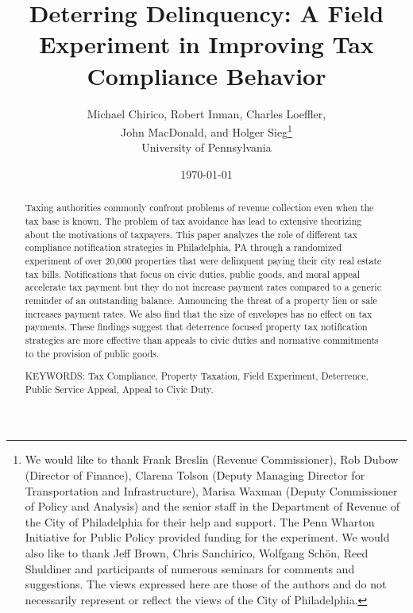 \documentclass[12pt,titlepage]{article}
\renewcommand{\thefootnote}{\fnsymbol{footnote}}
\begin{document}
\title{Deterring Delinquency: A Field Experiment in Improving Tax Compliance Behavior}

\author{Michael Chirico, Robert Inman, Charles Loeffler, \\
        John MacDonald, and Holger Sieg\thanks{We would like to
        thank Frank Breslin (Revenue Commissioner), Rob Dubow (Director of Finance), Clarena Tolson (Deputy Managing Director for Transportation and Infrastructure),  Marisa Waxman (Deputy Commissioner of Policy and Analysis) and the senior staff in the Department of Revenue of the City
        of Philadelphia for their help and support.  The Penn Wharton Initiative for Public Policy provided funding for the experiment. We would also like to thank Jeff Brown, Chris
    Sanchirico, Wolfgang Sch\"on, Reed Shuldiner and participants of
    numerous seminars for comments and suggestions. The views
    expressed here are those of the authors and do not necessarily
    represent or reflect the views of the City of Philadelphia.}  \\
        University of Pennsylvania}

\date{\today}

\maketitle

\begin{abstract}

Taxing authorities commonly confront problems of revenue collection
even when the tax base is known.  The problem of tax avoidance has lead to 
extensive theorizing about the motivations of taxpayers.  This paper analyzes the role of different
tax compliance notification strategies in Philadelphia, PA through a randomized experiment of over 20,000 properties 
that were delinquent paying their city real estate tax bills.  Notifications that focus on civic duties, 
public goods, and moral appeal accelerate tax payment but they do not increase payment rates compared to 
a generic reminder of an outstanding balance.  Announcing the threat of a property lien or sale 
increases payment rates. We also find that the size of envelopes has no effect on tax payments.
These findings suggest that deterrence focused property tax notification strategies are more effective
than appeals to civic duties and normative commitments to the provision of public goods.

\noindent KEYWORDS: Tax Compliance, Property Taxation, Field
Experiment, Deterrence, Public Service Appeal, Appeal to Civic Duty.

\end{abstract}
\renewcommand{\thefootnote}{\arabic{footnote}}
\end{document}
